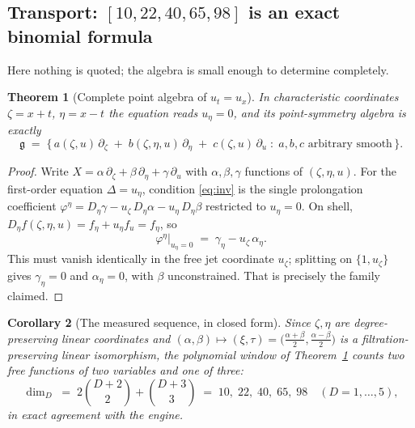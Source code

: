 \documentclass[11pt]{article}
\theoremstyle{plain}
\newtheorem{theorem}{Theorem}[section]
\newtheorem{corollary}[theorem]{Corollary}
\theoremstyle{definition}
\theoremstyle{remark}
\newcommand{\g}{\mathfrak{g}}
\begin{document}
\subsection{Transport: $[10,22,40,65,98]$ is an exact binomial formula}

Here nothing is quoted; the algebra is small enough to determine completely.

\begin{theorem}[Complete point algebra of $u_t=u_x$]\label{thm:transport}
In characteristic coordinates $\zeta=x+t$, $\eta=x-t$ the equation reads $u_\eta=0$, and its
point-symmetry algebra is \emph{exactly}
\[
\g \;=\;\Big\{\,a(\zeta,u)\,\partial_\zeta \;+\; b(\zeta,\eta,u)\,\partial_\eta \;+\;
c(\zeta,u)\,\partial_u \;:\; a,b,c \text{ arbitrary smooth}\,\Big\}.
\]
\end{theorem}

\begin{proof}
Write $X=\alpha\,\partial_\zeta+\beta\,\partial_\eta+\gamma\,\partial_u$ with
$\alpha,\beta,\gamma$ functions of $(\zeta,\eta,u)$. For the first-order equation
$\Delta=u_\eta$, condition \eqref{eq:inv} is the single prolongation coefficient
$\varphi^{\eta}=D_\eta\gamma-u_\zeta\,D_\eta\alpha-u_\eta\,D_\eta\beta$ restricted to
$u_\eta=0$. On shell, $D_\eta f(\zeta,\eta,u)=f_\eta+u_\eta f_u=f_\eta$, so
\[
\varphi^{\eta}\big|_{u_\eta=0}\;=\;\gamma_\eta-u_\zeta\,\alpha_\eta .
\]
This must vanish identically in the free jet coordinate $u_\zeta$; splitting on $\{1,u_\zeta\}$
gives $\gamma_\eta=0$ and $\alpha_\eta=0$, with $\beta$ unconstrained. That is precisely the family
claimed.
\end{proof}

\begin{corollary}[The measured sequence, in closed form]\label{cor:transport}
Since $\zeta,\eta$ are degree-preserving linear coordinates and
$(\alpha,\beta)\mapsto(\xi,\tau)=\big(\tfrac{\alpha+\beta}{2},\tfrac{\alpha-\beta}{2}\big)$ is a
filtration-preserving linear isomorphism, the polynomial window of Theorem~\ref{thm:transport}
counts two free functions of \emph{two} variables and one of \emph{three}:
\[
\dim_D\;=\;2\binom{D+2}{2}+\binom{D+3}{3}
\;=\;10,\;22,\;40,\;65,\;98 \quad (D=1,\dots,5),
\]
in exact agreement with the engine.
\end{corollary}
\end{document}

